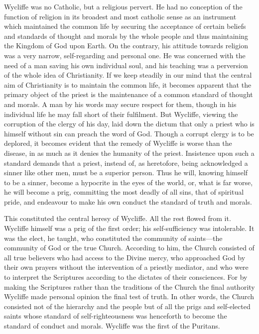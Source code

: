 \documentclass{book}
\begin{document}
Wycliffe was no Catholic, but a religious pervert. He had no conception of the function of religion in its broadest and most catholic sense as an instrument which maintained the common life by securing the acceptance of certain beliefs and standards of thought and morals by the whole people and thus maintaining the Kingdom of God upon Earth. On the contrary, his attitude towards religion was a very narrow, self-regarding and personal one. He was concerned with the need of a man saving his own individual soul, and his teaching was a perversion of the whole idea of Christianity. If we keep steadily in our mind that the central aim of Christianity is to maintain the common life, it becomes apparent that the primary object of the priest is the maintenance of a common standard of thought and morals. A man by his words may secure respect for them, though in his individual life he may fall short of their fulfilment. But Wycliffe, viewing the corruption of the clergy of his day, laid down the dictum that only a priest who is himself without sin can preach the word of God. Though a corrupt clergy is to be deplored, it becomes evident that the remedy of Wycliffe is worse than the disease, in as much as it denies the humanity of the priest. Insistence upon such a standard demands that a priest, instead of, as heretofore, being acknowledged a sinner like other men, must be a superior person. Thus he will, knowing himself to be a sinner, become a hypocrite in the eyes of the world, or, what is far worse, he will become a prig, committing the most deadly of all sins, that of spiritual pride, and endeavour to make his own conduct the standard of truth and morals.

This constituted the central heresy of Wycliffe. All the rest flowed from it. Wycliffe himself was a prig of the first order; his self-sufficiency was intolerable. It was the elect, he taught, who constituted the community of saints—the community of God or the true Church. According to him, the Church consisted of all true believers who had access to the Divine mercy, who approached God by their own prayers without the intervention of a priestly mediator, and who were to interpret the Scriptures according to the dictates of their consciences. For by making the Scriptures rather than the traditions of the Church the final authority Wycliffe made personal opinion the final test of truth. In other words, the Church consisted not of the hierarchy and the people but of all the prigs and self-elected saints whose standard of self-righteousness was henceforth to become the standard of conduct and morals. Wycliffe was the first of the Puritans.
\end{document}
